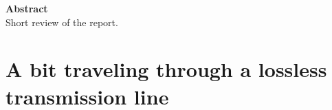 \documentclass[a4paper, 11pt]{article}
\begin{document}



\begin{tcolorbox}[colframe=ugent_blue, colback=ugent_blue!10, enhanced jigsaw, boxrule=0.5pt]
{\bf Abstract}\\
Short review of the report.
\end{tcolorbox}



\section{A bit traveling through a lossless transmission line}

    

    

    

    
\end{document}
